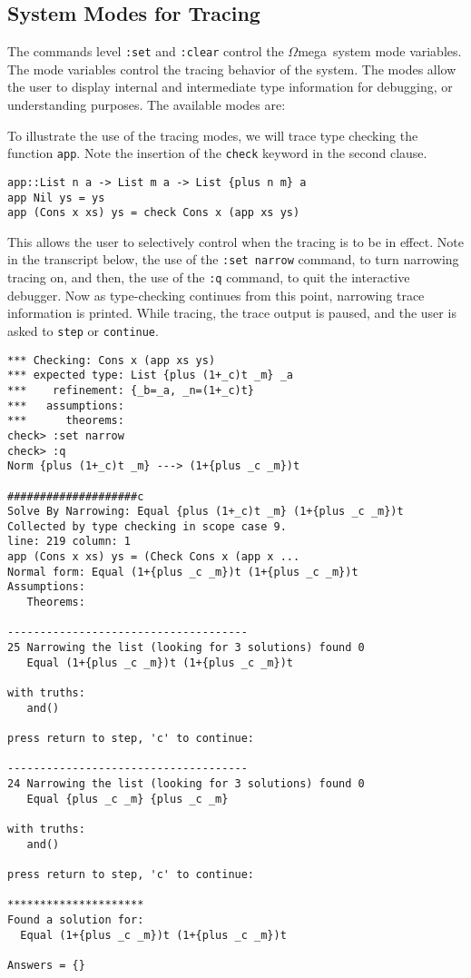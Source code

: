 \documentclass[11pt,twoside]{article}
\newcommand{\om}{$\Omega$mega}
\begin{document}
\subsection{System Modes for Tracing}
The commands level {\tt :set} and {\tt :clear} control the
\om\ system mode variables.
The mode variables control the tracing behavior of the system. The modes
allow the user to display internal and intermediate type
information for debugging, or understanding purposes.
The available modes are:



To illustrate the use of the tracing modes, we will trace type checking the function
{\tt app}. Note the insertion of the {\tt check} keyword
in the second clause.

\begin{verbatim}
app::List n a -> List m a -> List {plus n m} a
app Nil ys = ys
app (Cons x xs) ys = check Cons x (app xs ys)
\end{verbatim}

This allows the user to selectively control when the tracing is to be in effect.
Note in the transcript below, the use of the {\tt :set narrow} command, to turn
narrowing tracing on, and then, the use of the {\tt :q} command, to quit the
interactive debugger. Now as type-checking continues from this point, narrowing
trace information is printed. While tracing, the trace output is paused, and the
user is asked to {\tt step} or {\tt continue}.

\begin{verbatim}
*** Checking: Cons x (app xs ys)
*** expected type: List {plus (1+_c)t _m} _a
***    refinement: {_b=_a, _n=(1+_c)t}
***   assumptions:
***      theorems:
check> :set narrow
check> :q
Norm {plus (1+_c)t _m} ---> (1+{plus _c _m})t

####################c
Solve By Narrowing: Equal {plus (1+_c)t _m} (1+{plus _c _m})t
Collected by type checking in scope case 9.
line: 219 column: 1
app (Cons x xs) ys = (Check Cons x (app x ...
Normal form: Equal (1+{plus _c _m})t (1+{plus _c _m})t
Assumptions:
   Theorems:

-------------------------------------
25 Narrowing the list (looking for 3 solutions) found 0
   Equal (1+{plus _c _m})t (1+{plus _c _m})t

with truths:
   and()

press return to step, 'c' to continue:

-------------------------------------
24 Narrowing the list (looking for 3 solutions) found 0
   Equal {plus _c _m} {plus _c _m}

with truths:
   and()

press return to step, 'c' to continue:

*********************
Found a solution for:
  Equal (1+{plus _c _m})t (1+{plus _c _m})t

Answers = {}
\end{verbatim}
\end{document}
